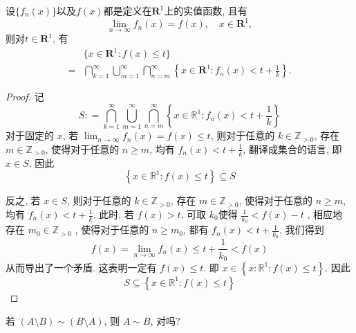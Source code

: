 \documentclass[../main.tex]{subfiles}
\begin{document}
\begin{exercise}{}{}
   
    设$\{f_n(x)\}$以及$f(x)$都是定义在$\mathbf{R}^1$上的实值函数, 且有
    \[
        \lim_{n\to\infty}f_n(x) = f(x), \quad x \in \mathbf{R}^1,
    \]
    则对$t \in \mathbf{R}^1$, 有
    \[\begin{aligned}
        &\{x \in \mathbf{R}^1: f(x) \le t\} \\
        ={}& \bigcap_{k=1}^{\infty}\bigcup_{m=1}^{\infty}\bigcap_{n=m}^{\infty}\left\{x \in \mathbf{R}^1: f_n(x) < t + \frac{1}{k}\right\}.
    \end{aligned}\]
\end{exercise}
\begin{proof}
    记 \[
    S: = \bigcap _{k= 1}^{\infty}\bigcup _{m= 1}^{\infty}\bigcap _{n = m}^{\infty}\left\{ x\in \mathbb{R} ^{1}:  f_{n}\left( x \right)< t+ \frac{1 }{k }   \right\}
    \]
    对于固定的 \(  x  \), 若 \( \lim_{n\to \infty}f_{n}\left( x \right)=    f\left( x \right)\le t   \), 则对于任意的 \(  k\in \mathbb{Z} _{> 0}  \), 存在   \(  m \in \mathbb{Z} _{> 0}  \), 使得对于任意的 \(  n\ge m  \), 均有 \(  f_{n}\left( x \right) < t+ \frac{1 }{k }    \), 翻译成集合的语言, 即 \(  x \in S  \). 因此 \[
    \left\{ x\in \mathbb{R} ^{1}: f\left( x \right)\le t  \right\}\subseteq S
    \] 
    
    反之, 若 \(  x \in S  \),   则对于任意的 \(  k\in \mathbb{Z} _{> 0}  \), 存在   \(  m \in \mathbb{Z} _{> 0}  \), 使得对于任意的 \(  n\ge m  \), 均有 \(  f_{n}\left( x \right) < t+ \frac{1 }{k }    \). 此时, 若 \(  f\left( x \right)> t   \), 可取 \(  k_0  \)使得 \(  \frac{1 }{k_0 }< f\left( x \right)-t    \)  , 相应地 存在 \(  m_0\in \mathbb{Z} _{> 0}  \)  , 使得对于任意的 \(  n\ge m_0  \), 都有  \(  f_{n}\left( x \right)< t+ \frac{1 }{k_0 }    \). 我们得到 \[
    f\left( x \right)= \lim_{n\to \infty}f_{n}\left( x \right)\le t+ \frac{1 }{k_0 }< f\left( x \right)    
    \]   从而导出了一个矛盾. 这表明一定有 \(  f\left( x \right)\le t   \). 即 \(  x \in \left\{ x:\mathbb{R} ^{1}:f\left( x \right)\le t  \right\}  \). 因此 \[
    S\subseteq \left\{ x\in \mathbb{R} ^{1}:f\left( x \right)\le t  \right\}
    \]  
\end{proof}

\begin{exercise}{}{}
    若 $(A \setminus B) \sim (B \setminus A)$, 则 $A \sim B$, 对吗?
\end{exercise}
\end{document}
